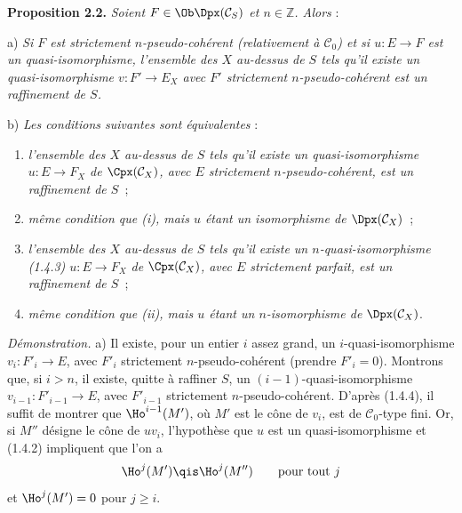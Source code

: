 \textbf{Proposition 2.2.} \emph{Soient \(F\in\Ob\Dpx(\mathcal C_S)\) et \(n\in\mathbb Z\). Alors} :

a) \emph{Si \(F\) est strictement \(n\)-pseudo-cohérent (relativement à \(\mathcal C_0\)) et si \(u:E\to F\) est un quasi-isomorphisme, l'ensemble des \(X\) au-dessus de \(S\) tels qu'il existe un quasi-isomorphisme \(v:F'\longrightarrow E_X\) avec \(F'\) strictement \(n\)-pseudo-cohérent est un raffinement de \(S\).}

b) \emph{Les conditions suivantes sont équivalentes} :
\begin{enumerate}[label=(\roman*)]
\item \emph{l'ensemble des \(X\) au-dessus de \(S\) tels qu'il existe un quasi-isomorphisme \(u:E\longrightarrow F_X\) de \(\Cpx(\mathcal C_X)\), avec \(E\) strictement \(n\)-pseudo-cohérent, est un raffinement de \(S\)}~;
\item[\((\mathrm{i}')\)] \emph{même condition que (i), mais \(u\) étant un isomorphisme de \(\Dpx(\mathcal C_X)\)}~;
\item \emph{l'ensemble des \(X\) au-dessus de \(S\) tels qu'il existe un \(n\)-quasi-isomorphisme (1.4.3) \(u:E\longrightarrow F_X\) de \(\Cpx(\mathcal C_X)\), avec \(E\) strictement parfait, est un raffinement de \(S\)}~;
\item[\((\mathrm{ii}')\)] \emph{même condition que (ii), mais \(u\) étant un \(n\)-isomorphisme de \(\Dpx(\mathcal C_X)\)}.
\end{enumerate}

\emph{Démonstration.} a) Il existe, pour un entier \(i\) assez grand, un \(i\)-quasi-isomorphisme \(v_i:F'_i\longrightarrow E\), avec \(F'_i\) strictement \(n\)-pseudo-cohérent (prendre \(F'_i=0\)). Montrons que, si \(i>n\), il existe, quitte à raffiner \(S\), un \((i-1)\)-quasi-isomorphisme \(v_{i-1}:F'_{i-1}\longrightarrow E\), avec \(F'_{i-1}\) strictement \(n\)-pseudo-cohérent. D'après (1.4.4), il suffit de montrer que \(\Ho^{i-1}(M')\), où \(M'\) est le cône de \(v_i\), est de \(\mathcal C_0\)-type fini. Or, si \(M''\) désigne le cône de \(uv_i\), l'hypothèse que \(u\) est un quasi-isomorphisme et (1.4.2) impliquent que l'on a
\[
  \Ho^j(M')\qis \Ho^j(M'')\qquad\text{pour tout }j
\]
et \(\Ho^j(M')=0\) pour \(j\geq i\).
